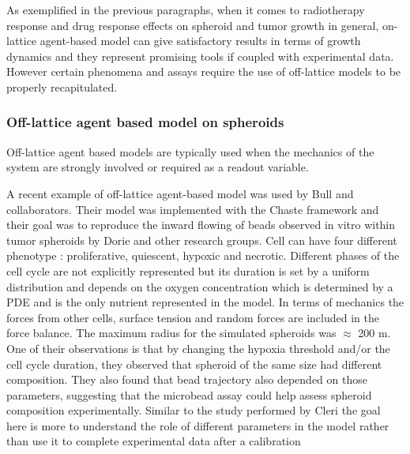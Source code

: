 \documentclass[11pt,a4paper]{article}
\begin{document}
As exemplified in the previous paragraphs, when it comes to radiotherapy response and drug response effects on spheroid and tumor growth in general, on-lattice agent-based model can give satisfactory results in terms of growth dynamics and they represent promising tools if coupled with experimental data. However certain phenomena and assays require the use of off-lattice models to be properly recapitulated.


\subsubsection{Off-lattice agent based model on spheroids}
Off-lattice agent based models are typically used when the mechanics of the system are strongly involved or required   as a readout variable.

A recent example of off-lattice agent-based model was used by Bull and collaborators.\cite{Bull2020} Their model was implemented with the Chaste framework and their goal was to reproduce the inward flowing of beads observed in vitro within tumor spheroids by Dorie and other research groups.\cite{Dorie1982}\cite{Delarue2013} Cell can have four different phenotype : proliferative, quiescent, hypoxic and necrotic. Different phases of the cell cycle are not explicitly represented but its duration is set by a uniform distribution and depends on the oxygen concentration which is determined by a PDE and is the only nutrient represented in the model. In terms of mechanics the forces from other cells, surface  tension and random forces are included in the force balance. The maximum radius for the simulated spheroids was $\approx$ 200 \textmu m. One of their observations is that by changing the hypoxia threshold and/or the cell cycle duration, they observed that spheroid of the same size had different composition. They also found that bead trajectory also depended on those parameters,  suggesting that the microbead assay could help assess spheroid composition experimentally. Similar to the study performed by Cleri the goal here is more to understand the role of different parameters in the model rather than use it to complete experimental data after a calibration
\end{document}
